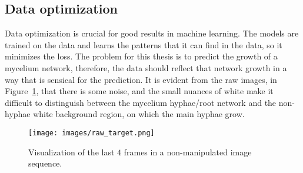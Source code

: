 \documentclass[a4paper,12pt]{article}
\begin{document}
\subsection{Data optimization}
Data optimization is crucial for good results in machine learning. The models are trained on the data and learns the patterns that it can find in the data, so it minimizes the loss. The problem for this thesis is to predict the growth of a mycelium network, therefore, the data should reflect that network growth in a way that is sensical for the prediction.
It is evident from the raw images, in Figure~\ref{fig:n11}, that there is some noise, and the small nuances of white make it difficult to distinguish between the mycelium hyphae/root network and the non-hyphae white background region, on which the main hyphae grow.
\begin{figure}[H]
\centering
\texttt{[image: images/raw\_target.png]}
\caption{Visualization of the last $4$ frames in a non-manipulated image sequence.} %
\label{fig:n11}
\end{figure}
\end{document}
